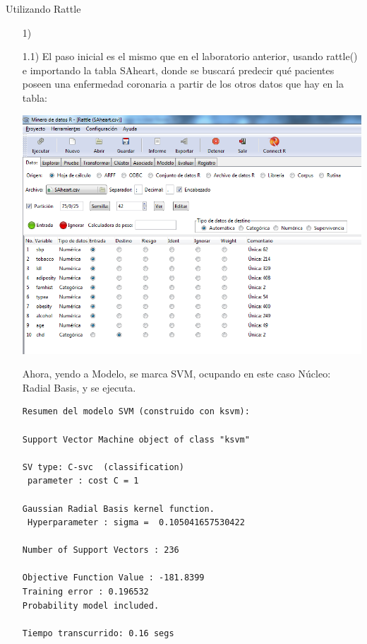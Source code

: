 \documentclass[11pt,a4paper]{report}
\begin{document}


\newpage

\begin{center}
Utilizando Rattle
\end{center}

\begin{itemize}
\item[1)]
\item[1.1)] El paso inicial es el mismo que en el laboratorio anterior, usando rattle() e importando la tabla SAheart, donde se buscará predecir qué pacientes poseen una enfermedad coronaria a partir de los otros datos que hay en la tabla:
\begin{center}
\includegraphics[scale=0.6]{4-1.png}
\end{center}
Ahora, yendo a Modelo, se marca SVM, ocupando en este caso Núcleo: Radial Basis, y se ejecuta.

\begin{verbatim}
Resumen del modelo SVM (construido con ksvm):

Support Vector Machine object of class "ksvm" 

SV type: C-svc  (classification) 
 parameter : cost C = 1 

Gaussian Radial Basis kernel function. 
 Hyperparameter : sigma =  0.105041657530422 

Number of Support Vectors : 236 

Objective Function Value : -181.8399 
Training error : 0.196532 
Probability model included. 

Tiempo transcurrido: 0.16 segs
\end{verbatim}


\end{itemize}
\end{document}
